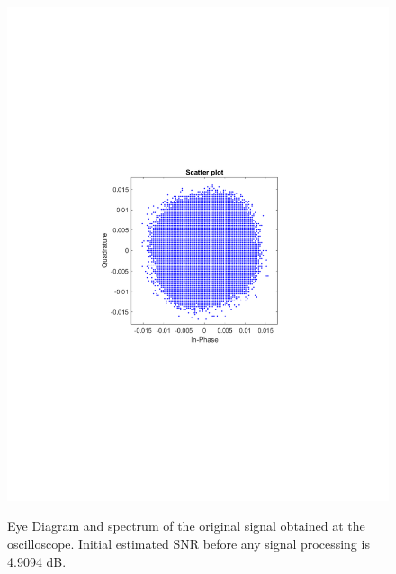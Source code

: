 \begin{refsection}
\begin{figure}[H]
\begin{minipage}{0.30\textwidth}
		\includegraphics[clip, trim=4cm 8cm 4cm 8cm, width=1\textwidth]{./sdf/m_qam_system/figures/expResults/homodyne/0_const_4GBdInSig13dBc_bfFec.pdf}
		\label{fig:4GBdSpecBefFecCHm}
	\end{minipage}
	\caption{Eye Diagram and spectrum of the original signal obtained at the oscilloscope. Initial estimated SNR before any signal processing is 4.9094 dB.}
	\label{fig:4GBdinitHm}
\end{figure}


\end{refsection}
